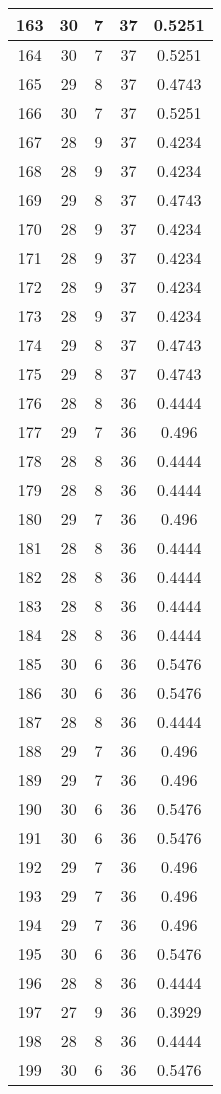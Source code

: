 \documentclass[letterpaper, 12pt]{article}
\begin{document}
\begin{longtable}{|c|c|c|c|c|}
\hline
163 & 30 & 7 & 37 & 0.5251 \\
\hline
164 & 30 & 7 & 37 & 0.5251 \\
\hline
165 & 29 & 8 & 37 & 0.4743 \\
\hline
166 & 30 & 7 & 37 & 0.5251 \\
\hline
167 & 28 & 9 & 37 & 0.4234 \\
\hline
168 & 28 & 9 & 37 & 0.4234 \\
\hline
169 & 29 & 8 & 37 & 0.4743 \\
\hline
170 & 28 & 9 & 37 & 0.4234 \\
\hline
171 & 28 & 9 & 37 & 0.4234 \\
\hline
172 & 28 & 9 & 37 & 0.4234 \\
\hline
173 & 28 & 9 & 37 & 0.4234 \\
\hline
174 & 29 & 8 & 37 & 0.4743 \\
\hline
175 & 29 & 8 & 37 & 0.4743 \\
\hline
176 & 28 & 8 & 36 & 0.4444 \\
\hline
177 & 29 & 7 & 36 & 0.496 \\
\hline
178 & 28 & 8 & 36 & 0.4444 \\
\hline
179 & 28 & 8 & 36 & 0.4444 \\
\hline
180 & 29 & 7 & 36 & 0.496 \\
\hline
181 & 28 & 8 & 36 & 0.4444 \\
\hline
182 & 28 & 8 & 36 & 0.4444 \\
\hline
183 & 28 & 8 & 36 & 0.4444 \\
\hline
184 & 28 & 8 & 36 & 0.4444 \\
\hline
185 & 30 & 6 & 36 & 0.5476 \\
\hline
186 & 30 & 6 & 36 & 0.5476 \\
\hline
187 & 28 & 8 & 36 & 0.4444 \\
\hline
188 & 29 & 7 & 36 & 0.496 \\
\hline
189 & 29 & 7 & 36 & 0.496 \\
\hline
190 & 30 & 6 & 36 & 0.5476 \\
\hline
191 & 30 & 6 & 36 & 0.5476 \\
\hline
192 & 29 & 7 & 36 & 0.496 \\
\hline
193 & 29 & 7 & 36 & 0.496 \\
\hline
194 & 29 & 7 & 36 & 0.496 \\
\hline
195 & 30 & 6 & 36 & 0.5476 \\
\hline
196 & 28 & 8 & 36 & 0.4444 \\
\hline
197 & 27 & 9 & 36 & 0.3929 \\
\hline
198 & 28 & 8 & 36 & 0.4444 \\
\hline
199 & 30 & 6 & 36 & 0.5476 \\
\hline
\end{longtable}
\end{document}
